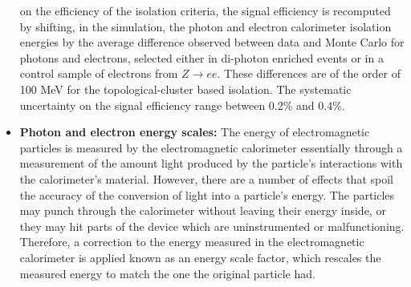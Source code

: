 \begin{itemize}
on the efficiency of the isolation criteria, the signal efficiency is recomputed
by shifting, in the simulation, the photon and electron calorimeter isolation
energies by the average difference observed between data and Monte Carlo for
photons and electrons, selected either in di-photon enriched events or
in a control sample of electrons from $Z \to ee$. These differences are of the
order of 100 MeV for the topological-cluster based isolation. The systematic
uncertainty on the signal efficiency range between 0.2\% and 0.4\%.
%
\item \textbf{Photon and electron energy scales:}
The energy of electromagnetic particles is measured by the electromagnetic 
calorimeter essentially through a measurement of the amount light produced by
the particle's interactions with the calorimeter's material. However, there
are a number of effects that spoil the accuracy of the conversion of light into
a particle's energy. The particles may punch through the calorimeter without leaving
their energy inside, or they may hit parts of the device which are uninstrumented or
malfunctioning. Therefore, a correction to the energy measured in the 
electromagnetic calorimeter is applied known as an energy scale factor, which
rescales the measured energy to match the one the original particle had.


\end{itemize}
